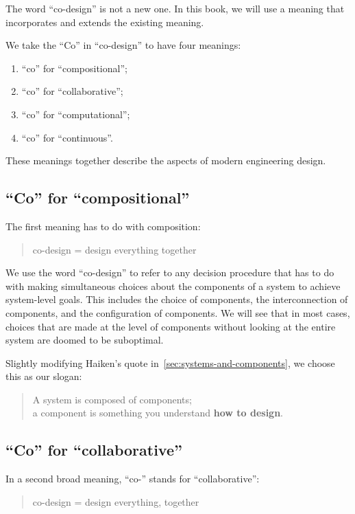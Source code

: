 The word ``co-design'' is not a new one. In this book, we will use
a meaning that incorporates and extends the existing meaning.

We take the ``Co'' in ``co-design'' to have four meanings:
\begin{enumerate}
    \item ``co'' for ``compositional'';
    \item ``co'' for ``collaborative'';
    \item  ``co'' for ``computational'';
    \item   ``co'' for ``continuous''.
\end{enumerate}
These meanings together describe the aspects of modern engineering design.

\subsection{``Co'' for ``compositional''}

The first meaning has to do with composition:

\begin{quote}
    co-design = design everything together
\end{quote}

We use the word ``co-design'' to refer to any decision procedure that has to do with making
simultaneous choices about the components of a system to achieve system-level
goals. This includes the choice of components, the interconnection of components, and the configuration of components. We will see that in most cases, choices that are made at the level of components without looking at the entire system are doomed to be suboptimal.


Slightly modifying Haiken's quote in~\cref{sec:systems-and-components}, we choose this as our slogan:

\begin{quote}
    A system is composed of components;\\
    a component is something you understand
    \textbf{how to design}.
\end{quote}

\subsection{``Co'' for ``collaborative''}

In a second broad meaning, ``co-'' stands for ``collaborative'':

\begin{quote}
    co-design = design everything, together
\end{quote}


